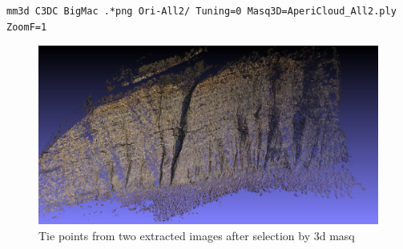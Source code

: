 \begin{verbatim}
mm3d C3DC BigMac .*png Ori-All2/ Tuning=0 Masq3D=AperiCloud_All2.ply ZoomF=1
\end{verbatim}

\begin{figure}
\centering
\includegraphics[width=0.90\linewidth]{FIGS/GoProVideo/PLY-Climb00.jpg}
\caption{Tie points from  two extracted images after selection by $3$d masq}
\label{fig:GoProPlyFin}
\end{figure}



